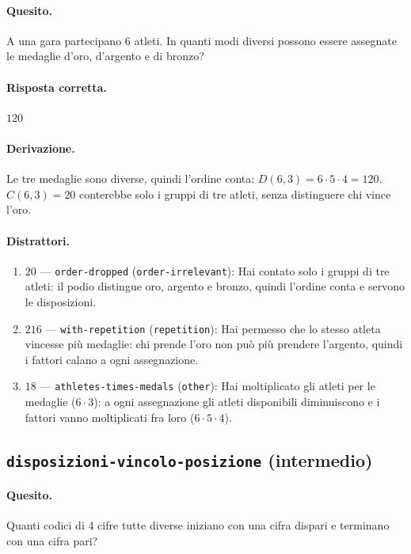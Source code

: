 \paragraph{Quesito.} A una gara partecipano 6 atleti. In quanti modi diversi possono essere assegnate le medaglie d'oro, d'argento e di bronzo?

\paragraph{Risposta corretta.} $120$

\paragraph{Derivazione.} Le tre medaglie sono diverse, quindi l'ordine conta: $D(6,3) = 6 \cdot  5 \cdot  4 = 120$. $C(6,3) = 20$ conterebbe solo i gruppi di tre atleti, senza distinguere chi vince l'oro.

\paragraph{Distrattori.}
\begin{enumerate}
  \item $20$ --- \texttt{order-dropped} (\texttt{order-irrelevant}): Hai contato solo i gruppi di tre atleti: il podio distingue oro, argento e bronzo, quindi l'ordine conta e servono le disposizioni.
  \item $216$ --- \texttt{with-repetition} (\texttt{repetition}): Hai permesso che lo stesso atleta vincesse più medaglie: chi prende l'oro non può più prendere l'argento, quindi i fattori calano a ogni assegnazione.
  \item $18$ --- \texttt{athletes-times-medals} (\texttt{other}): Hai moltiplicato gli atleti per le medaglie ($6 \cdot  3$): a ogni assegnazione gli atleti disponibili diminuiscono e i fattori vanno moltiplicati fra loro ($6 \cdot  5 \cdot  4$).
\end{enumerate}

\subsection{\texorpdfstring{\texttt{disposizioni-vincolo-posizione} (intermedio)}{disposizioni-vincolo-posizione (intermedio)}}

\paragraph{Quesito.} Quanti codici di 4 cifre tutte diverse iniziano con una cifra dispari e terminano con una cifra pari?

